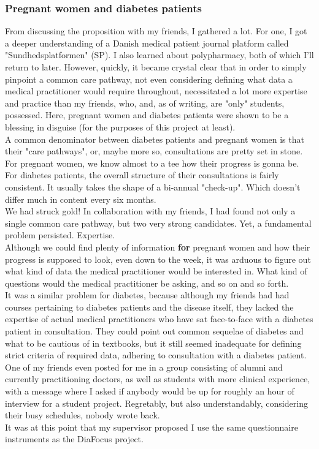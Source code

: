 \subsubsection*{Pregnant women and diabetes patients}
From discussing the proposition with my friends, I gathered a lot. For one, I got a deeper understanding of a Danish medical patient journal platform called "Sundhedsplatformen" (SP). I also learned about polypharmacy, both of which I'll return to later. However, quickly, it became crystal clear that in order to simply pinpoint a common care pathway, not even considering defining what data a medical practitioner would require throughout, necessitated a lot more expertise and practice than my friends, who, and, as of writing, are "only" students, possessed. Here, pregnant women and diabetes patients were shown to be a blessing in disguise (for the purposes of this project at least).
\\
A common denominator between diabetes patients and pregnant women is that their "care pathways", or, maybe more so, consultations are pretty set in stone. For pregnant women, we know almost to a tee how their progress is gonna be. For diabetes patients, the overall structure of their consultations is fairly consistent. It usually takes the shape of a bi-annual "check-up". Which doesn't differ much in content every six months.
\\
We had struck gold! In collaboration with my friends, I had found not only a single common care pathway, but two very strong candidates. Yet, a fundamental problem persisted. Expertise.
\\
Although we could find plenty of information \textbf{for} pregnant women and how their progress is supposed to look, even down to the week, it was arduous to figure out what kind of data the medical practitioner would be interested in. What kind of questions would the medical practitioner be asking, and so on and so forth. 
\\
It was a similar problem for diabetes, because although my friends had had courses pertaining to diabetes patients and the disease itself, they lacked the expertise of actual medical practitioners who have sat face-to-face with a diabetes patient in consultation. They could point out common sequelae of diabetes and what to be cautious of in textbooks, but it still seemed inadequate for defining strict criteria of required data, adhering to consultation with a diabetes patient. 
\\
One of my friends even posted for me in a group consisting of alumni and currently practitioning doctors, as well as students with more clinical experience, with a message where I asked if anybody would be up for roughly an hour of interview for a student project. Regretably, but also understandably, considering their busy schedules, nobody wrote back.
\\
It was at this point that my supervisor proposed I use the same questionnaire instruments as the DiaFocus project.



